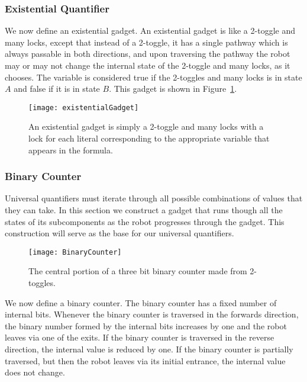 \subsubsection{Existential Quantifier}
We now define an existential gadget. An existential gadget is like a 2-toggle and many locks, except that instead of a
2-toggle, it has a single pathway which is always passable in both directions, and upon traversing the pathway
the robot may or may not change the internal state of the 2-toggle and many locks, as it chooses. The variable is 
considered true if the 2-toggles and many locks is in state $A$ and false if it is in state $B$. This gadget
is shown in Figure~\ref{fig:Existential}.

\begin{figure}[h!]
\centering
    \texttt{[image: existentialGadget]}
    \caption{An existential gadget is simply a 2-toggle and many locks with a lock for each literal corresponding to the appropriate variable that appears in the formula.}
    \label{fig:Existential}
\end{figure}

\subsubsection{Binary Counter}

Universal quantifiers must iterate through all possible combinations of values that they can take. In this section we construct a gadget that runs though all the states of its subcomponents as the robot progresses through the gadget. This construction will serve as the base for our universal quantifiers.

\begin{figure}[h!]
\centering
    \texttt{[image: BinaryCounter]}
    \caption{The central portion of a three bit binary counter made from 2-toggles.}
    \label{fig:BinaryCounter}
\end{figure}
  
We now define a binary counter. The binary counter has a fixed number of internal bits.
Whenever the binary counter is traversed in the forwards direction, the binary number
formed by the internal bits increases by one and the robot leaves via one of the exits.
If the binary counter is traversed in the reverse direction, the internal value is reduced by
one. If the binary counter is partially traversed, but then the robot leaves via its initial entrance,
the internal value does not change.

